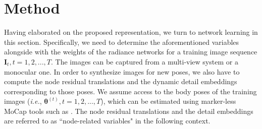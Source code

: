 

\section{Method}
\label{sec:method}
Having elaborated on the proposed representation, we turn to network learning in this section. 
Specifically, we need to determine the aforementioned variables alongside with the weights of the radiance networks for a training image sequence $\bm{I}_t, t=1, 2,..., T$. The images can be captured from a multi-view system or a monocular one. In order to synthesize images for new poses, we also have to compute the node residual translations and the dynamic detail embeddings corresponding to those poses. 
We assume access to the body poses of the training images (\textit{i.e.}, $\bm{\theta}^{(t)}, t=1, 2, ..., T$), which can be estimated using marker-less MoCap tools such as \cite{easymocap,lightcap2021}. The node residual translations and the detail embeddings are referred to as ``node-related variables" in the following context. 






